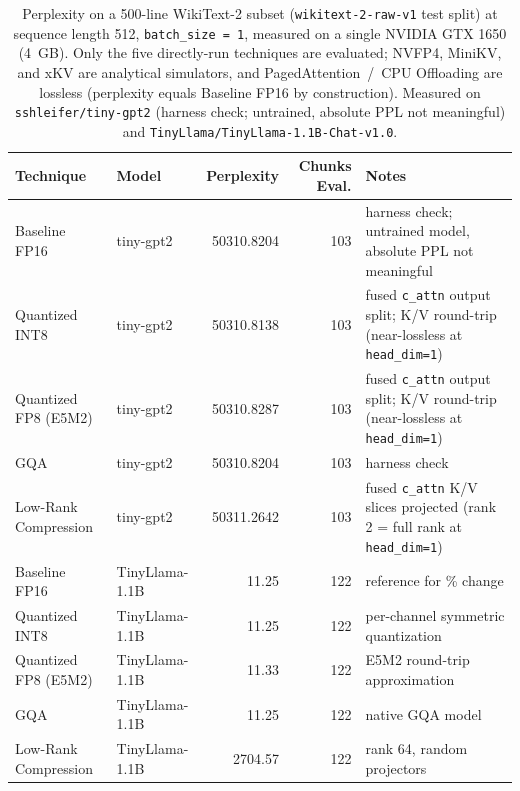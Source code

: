 \documentclass[conference]{IEEEtran}
\begin{document}
\begin{table}[htbp]
	\centering
	\caption{Perplexity on a 500-line WikiText-2 subset (\texttt{wikitext-2-raw-v1} test split) at sequence length 512, \texttt{batch\_size = 1}, measured on a single NVIDIA GTX 1650 (4~GB). Only the five directly-run techniques are evaluated; NVFP4, MiniKV, and xKV are analytical simulators, and PagedAttention~/~CPU Offloading are lossless (perplexity equals Baseline FP16 by construction). Measured on \texttt{sshleifer/tiny-gpt2} (harness check; untrained, absolute PPL not meaningful) and \texttt{TinyLlama/TinyLlama-1.1B-Chat-v1.0}.}
	\label{tab:perplexity}
	\small
	\begin{tabularx}{\linewidth}{llrrX}
		\toprule
		\textbf{Technique} & \textbf{Model} & \textbf{Perplexity} & \textbf{Chunks Eval.} & \textbf{Notes} \\
		\midrule
		Baseline FP16        & tiny-gpt2 & 50310.8204 & 103 & harness check; untrained model, absolute PPL not meaningful \\
		Quantized INT8       & tiny-gpt2 & 50310.8138 & 103 & fused \texttt{c\_attn} output split; K/V round-trip (near-lossless at \texttt{head\_dim=1}) \\
		Quantized FP8 (E5M2) & tiny-gpt2 & 50310.8287 & 103 & fused \texttt{c\_attn} output split; K/V round-trip (near-lossless at \texttt{head\_dim=1}) \\
		GQA                  & tiny-gpt2 & 50310.8204 & 103 & harness check \\
		Low-Rank Compression & tiny-gpt2 & 50311.2642 & 103 & fused \texttt{c\_attn} K/V slices projected (rank 2 = full rank at \texttt{head\_dim=1}) \\
		\midrule
		Baseline FP16        & TinyLlama-1.1B & 11.25 & 122 & reference for \% change \\
		Quantized INT8       & TinyLlama-1.1B & 11.25 & 122 & per-channel symmetric quantization \\
		Quantized FP8 (E5M2) & TinyLlama-1.1B & 11.33 & 122 & E5M2 round-trip approximation \\
		GQA                  & TinyLlama-1.1B & 11.25 & 122 & native GQA model \\
		Low-Rank Compression & TinyLlama-1.1B & 2704.57 & 122 & rank 64, random projectors \\
		\bottomrule
	\end{tabularx}
\end{table}
\end{document}
